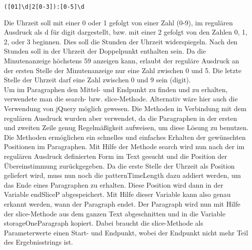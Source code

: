{\begin{verbatim}
([01]\d|2[0-3]):[0-5]\d
\end{verbatim}
Die Uhrzeit soll mit einer 0 oder 1 gefolgt von einer Zahl (0-9), im regulären Ausdruck als d für digit dargestellt, bzw. mit einer 2 gefolgt von den Zahlen 0, 1, 2, oder 3 beginnen. Dies soll die Stunden der Uhrzeit widerspiegeln. Nach den Stunden soll in der Uhrzeit der Doppelpunkt enthalten sein. Da die Minutenanzeige höchstens 59 anzeigen kann, erlaubt der reguläre Ausdruck an der ersten Stelle der Minutenanzeige nur eine Zahl zwischen 0 und 5. Die letzte Stelle der Uhrzeit darf eine Zahl zwischen 0 und 9 sein (digit). \\
Um im Paragraphen den Mittel- und Endpunkt zu finden und zu erhalten, verwendete man die search- bzw. slice-Methode. Alternativ wäre hier auch die Verwendung von jQuery möglich gewesen. Die Methoden in Verbindung mit dem regulären Ausdruck wurden aber verwendet, da die Paragraphen in der ersten und zweiten Zeile genug Regelmäßigkeit aufweisen, um diese Lösung zu benutzen. Die Methoden ermöglichen ein schnelles und einfaches Erhalten der gewünschten Positionen im Paragraphen.
Mit Hilfe der Methode search wird nun nach der im regulären Ausdruck definierten Form im Text gesucht und die Position der Übereinstimmung zurückgegeben. Da die erste Stelle der Uhrzeit als Position geliefert wird, muss nun noch die patternTimeLength dazu addiert werden, um das Ende eines Paragraphen zu erhalten. Diese Position wird dann in der Variable endSliceP abgespeichert. Mit Hilfe dieser Variable kann also genau erkannt werden, wann der Paragraph endet. Der Paragraph wird nun mit Hilfe der slice-Methode aus dem ganzen Text abgeschnitten und in die Variable storageOneParagraph kopiert. Dabei braucht die slice-Methode als Parameterwerte einen Start- und Endpunkt, wobei der Endpunkt nicht mehr Teil des Ergebnisstrings ist. 

}
